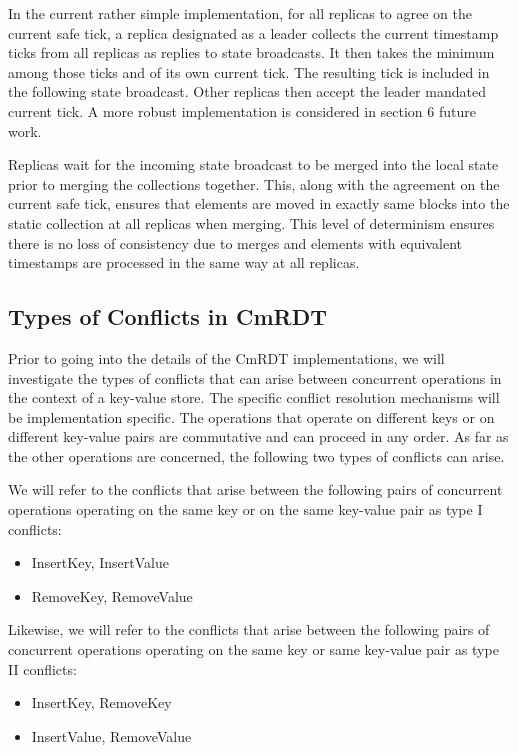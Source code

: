 \documentclass[sigconf,nonacm,10pt]{acmart}
\begin{document}
In the current rather simple implementation, for all replicas to agree on the current safe tick, a replica designated as a leader collects the current timestamp ticks from all replicas as replies to state broadcasts. It then takes the minimum among those ticks and of its own current tick. The resulting tick is included in the following state broadcast. Other replicas then accept the leader mandated current tick. A more robust implementation is considered in section 6 future work.

Replicas wait for the incoming state broadcast to be merged into the local state prior to merging the collections together. This, along with the agreement on the current safe tick, ensures that elements are moved in exactly same blocks into the static collection at all replicas when merging. This level of determinism ensures there is no loss of consistency due to merges and elements with equivalent timestamps are processed in the same way at all replicas.

\subsection{Types of Conflicts in CmRDT}
Prior to going into the details of the CmRDT implementations, we will investigate the types of conflicts that can arise between concurrent operations in the context of a key-value store. The specific conflict resolution mechanisms will be implementation specific. The operations that operate on different keys or on different key-value pairs are commutative and can proceed in any order. As far as the other operations are concerned, the following two types of conflicts can arise.

We will refer to the conflicts that arise between the following pairs of concurrent operations operating on the same key or on the same key-value pair as type I conflicts:
\begin{itemize}
 \item InsertKey, InsertValue
 \item RemoveKey, RemoveValue
\end{itemize}

Likewise, we will refer to the conflicts that arise between the following pairs of concurrent operations operating on the same key or same key-value pair as type II conflicts:
\begin{itemize}
 \item InsertKey, RemoveKey
 \item InsertValue, RemoveValue
\end{itemize}
\end{document}
